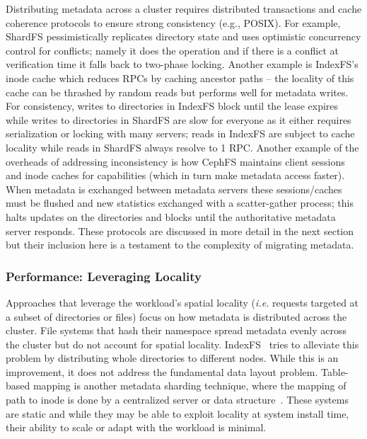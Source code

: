 Distributing metadata across a cluster requires distributed transactions and
cache coherence protocols to ensure strong consistency ({e.g.}, POSIX).  For
example, ShardFS pessimistically replicates directory state and uses optimistic
concurrency control for conflicts; namely it does the operation and if there is
a conflict at verification time it falls back to two-phase locking.  Another
example is IndexFS's inode cache which reduces RPCs by caching ancestor paths
-- the locality of this cache can be thrashed by random reads but performs well
for metadata writes. For consistency, writes to directories in IndexFS block
until the lease expires while writes to directories in ShardFS are slow for
everyone as it either requires serialization or locking with many servers;
reads in IndexFS are subject to cache locality while reads in ShardFS always
resolve to 1 RPC.  Another example of the overheads of addressing inconsistency
is how CephFS maintains client sessions and inode caches for capabilities
(which in turn make metadata access faster). When metadata is exchanged between
metadata servers these sessions/caches must be flushed and new statistics
exchanged with a scatter-gather process; this halts updates on the directories
and blocks until the authoritative metadata server responds.  These protocols
are discussed in more detail in the next section but their inclusion here is a
testament to the complexity of migrating metadata.

\subsubsection{Performance: Leveraging Locality}

Approaches that leverage the workload's spatial locality ({\it i.e.} requests
targeted at a subset of directories or files) focus on how metadata is
distributed across the cluster. File systems that hash their namespace spread
metadata evenly across the cluster but do not account for spatial locality.
IndexFS~\cite{patil:fast2011-giga+} tries to alleviate this problem by
distributing whole directories to different nodes.  While this is an
improvement, it does not address the fundamental data layout problem.
Table-based mapping is another metadata sharding technique, where the mapping
of path to inode is done by a centralized server or data
structure~\cite{xing:sc2009-skyfs, hildebrand:msst2005-pnfs,
thomson:fast2015-calvinfs}. These systems are static and while they may be able
to exploit locality at system install time, their ability to scale or adapt
with the workload is minimal.

